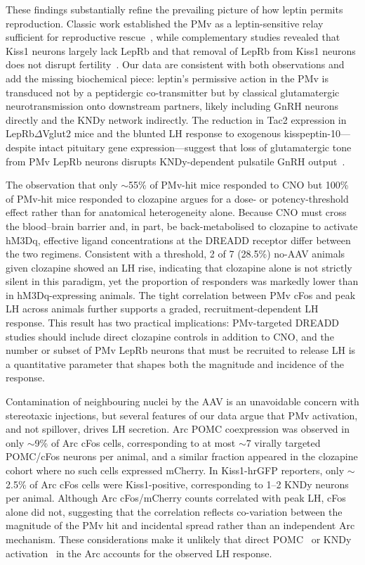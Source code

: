 \documentclass[11pt]{article}
\begin{document}
These findings substantially refine the prevailing picture of how leptin permits reproduction. Classic work established the PMv as a leptin-sensitive relay sufficient for reproductive rescue~\citep{donato2011leptin,mahany2018obesity,leshan2009direct,williams2011acute}, while complementary studies revealed that Kiss1 neurons largely lack LepRb and that removal of LepRb from Kiss1 neurons does not disrupt fertility~\citep{donato2011leptin,cravo2011kiss1,louis2011molecular,true2011leptin}. Our data are consistent with both observations and add the missing biochemical piece: leptin's permissive action in the PMv is transduced not by a peptidergic co-transmitter but by classical glutamatergic neurotransmission onto downstream partners, likely including GnRH neurons directly and the KNDy network indirectly. The reduction in Tac2 expression in LepRb$\Delta$Vglut2 mice and the blunted LH response to exogenous kisspeptin-10---despite intact pituitary gene expression---suggest that loss of glutamatergic tone from PMv LepRb neurons disrupts KNDy-dependent pulsatile GnRH output~\citep{navarro2011regulation,navarro2013interactions,gottsch2004role}.

The observation that only $\sim$55\% of PMv-hit mice responded to CNO but 100\% of PMv-hit mice responded to clozapine argues for a dose- or potency-threshold effect rather than for anatomical heterogeneity alone. Because CNO must cross the blood--brain barrier and, in part, be back-metabolised to clozapine to activate hM3Dq, effective ligand concentrations at the DREADD receptor differ between the two regimens. Consistent with a threshold, 2 of 7 (28.5\%) no-AAV animals given clozapine showed an LH rise, indicating that clozapine alone is not strictly silent in this paradigm, yet the proportion of responders was markedly lower than in hM3Dq-expressing animals. The tight correlation between PMv cFos and peak LH across animals further supports a graded, recruitment-dependent LH response. This result has two practical implications: PMv-targeted DREADD studies should include direct clozapine controls in addition to CNO, and the number or subset of PMv LepRb neurons that must be recruited to release LH is a quantitative parameter that shapes both the magnitude and incidence of the response.

Contamination of neighbouring nuclei by the AAV is an unavoidable concern with stereotaxic injections, but several features of our data argue that PMv activation, and not spillover, drives LH secretion. Arc POMC coexpression was observed in only $\sim$9\% of Arc cFos cells, corresponding to at most $\sim$7 virally targeted POMC/cFos neurons per animal, and a similar fraction appeared in the clozapine cohort where no such cells expressed mCherry. In Kiss1-hrGFP reporters, only $\sim$2.5\% of Arc cFos cells were Kiss1-positive, corresponding to 1--2 KNDy neurons per animal. Although Arc cFos/mCherry counts correlated with peak LH, cFos alone did not, suggesting that the correlation reflects co-variation between the magnitude of the PMv hit and incidental spread rather than an independent Arc mechanism. These considerations make it unlikely that direct POMC~\citep{manfredilozano2016defining,berglund2012direct} or KNDy activation~\citep{cravo2011kiss1} in the Arc accounts for the observed LH response.
\end{document}

